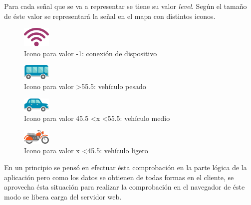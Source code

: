 Para cada señal que se va a representar se tiene su valor \textit{level}. Según el tamaño de éste valor se representará la señal en el mapa con distintos iconos.

\begin{figure}[!ht]
  \begin{center}
    \includegraphics[scale=1]{../images/map/0.png}
		\caption{Icono para valor -1: conexión de dispositivo}
    \label{fig:kaa}
	\end{center}
\end{figure}

\begin{figure}[!ht]
  \begin{center}
    \includegraphics[scale=1]{../images/map/1.png}
		\caption{Icono para valor \textgreater 55.5: vehículo pesado}
    \label{fig:kaa}
	\end{center}
\end{figure}

\begin{figure}[!ht]
  \begin{center}
    \includegraphics[scale=1]{../images/map/2.png}
		\caption{Icono para valor 45.5 \textless x \textless 55.5: vehículo medio}
    \label{fig:kaa}
	\end{center}
\end{figure}

\begin{figure}[!ht]
  \begin{center}
    \includegraphics[scale=1]{../images/map/3.png}
		\caption{Icono para valor x \textless 45.5: vehículo ligero}
    \label{fig:kaa}
	\end{center}
\end{figure}

En un principio se pensó en efectuar ésta comprobación en la parte lógica de la aplicación pero como los datos se obtienen de todas formas en el cliente, se aprovecha ésta situación para realizar la comprobación en el navegador de éste modo se libera carga del servidor web.

